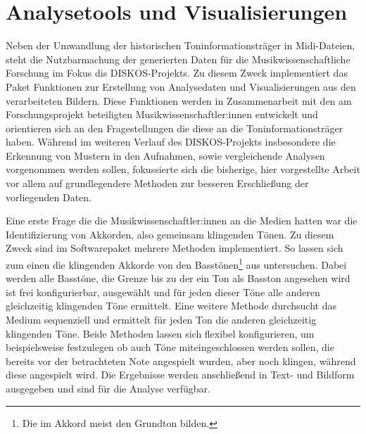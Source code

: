 \FloatBarrier
\section{Analysetools und Visualisierungen}

Neben der Umwandlung der historischen Toninformationsträger in Midi-Dateien, steht die Nutzbarmachung der generierten Daten für die Musikwissenschaftliche Forschung im Fokus dis DISKOS-Projekts.
Zu diesem Zweck implementiert das  Paket Funktionen zur Erstellung von Analysedaten und Visualisierungen aus den verarbeiteten Bildern.
Diese Funktionen werden in Zusammenarbeit mit den am Forschungsprojekt beteiligten Musikwissenschaftler:innen entwickelt und orientieren sich an den Fragestellungen die diese an die Toninformationsträger haben.
Während im weiteren Verlauf des DISKOS-Projekts insbesondere die Erkennung von Mustern in den Aufnahmen, sowie vergleichende Analysen vorgenommen werden sollen, fokussierte sich die bisherige, hier vorgestellte Arbeit vor allem auf grundlegendere Methoden zur besseren Erschließung der vorliegenden Daten.

Eine erste Frage die die Musikwissenschaftler:innen an die Medien hatten war die Identifizierung von Akkorden, also gemeinsam klingenden Tönen.
Zu diesem Zweck sind im Softwarepaket mehrere Methoden implementiert.
So lassen sich zum einen die klingenden Akkorde von den Basstönen\footnote{Die im Akkord meist den Grundton bilden.} aus untersuchen.
Dabei werden alle Basstöne, die Grenze bis zu der ein Ton als Basston angesehen wird ist frei konfigurierbar, ausgewählt und für jeden dieser Töne alle anderen gleichzeitig klingenden Töne ermittelt.
Eine weitere Methode durchsucht das Medium sequenziell und ermittelt für jeden Ton die anderen gleichzeitig klingenden Töne.
Beide Methoden lassen sich flexibel konfigurieren, um beispielsweise festzulegen ob auch Töne miteingeschlossen werden sollen, die bereits vor der betrachteten Note angespielt wurden, aber noch klingen, während diese angespielt wird.
Die Ergebnisse werden anschließend in Text- und Bildform ausgegeben und sind für die Analyse verfügbar.

